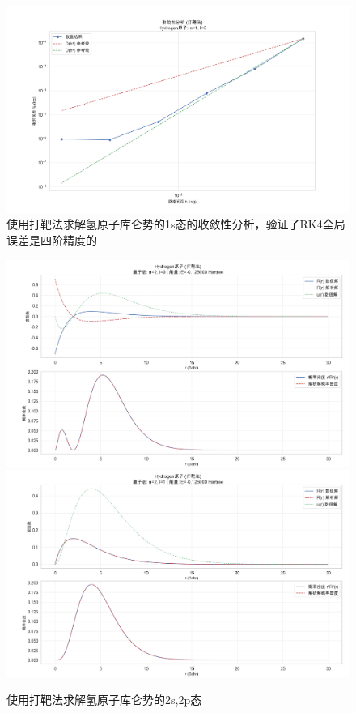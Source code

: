 \begin{figure}[H]
    \centering
    \includegraphics[width=1.0\textwidth]{Problem_2/figs/example_h_shooting_1s_con.png}
    \caption{使用打靶法求解氢原子库仑势的1s态的收敛性分析，验证了RK4全局误差是四阶精度的}
\end{figure}

\begin{figure}[H]
    \centering
    \includegraphics[width=1.0\textwidth]{Problem_2/figs/example_h_shooting_2s.png}
    \includegraphics[width=1.0\textwidth]{Problem_2/figs/example_h_shooting_2p.png}
    \caption{使用打靶法求解氢原子库仑势的2s,2p态}
\end{figure}

